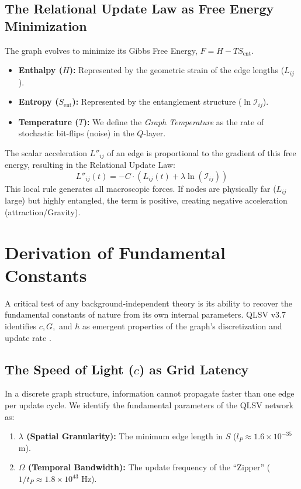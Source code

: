 \documentclass[11pt, a4paper]{article}
\begin{document}
\subsection{The Relational Update Law as Free Energy Minimization}
The graph evolves to minimize its Gibbs Free Energy, $F = H - TS_{\text{ent}}$.
\begin{itemize}
    \item \textbf{Enthalpy ($H$):} Represented by the geometric strain of the edge lengths ($L_{ij}$).
    \item \textbf{Entropy ($S_{\text{ent}}$):} Represented by the entanglement structure ($\ln \mathcal{I}_{ij}$).
    \item \textbf{Temperature ($T$):} We define the \textit{Graph Temperature} as the rate of stochastic bit-flips (noise) in the $Q$-layer.
\end{itemize}
The scalar acceleration $L''_{ij}$ of an edge is proportional to the gradient of this free energy, resulting in the Relational Update Law:
\begin{equation}
    L''_{ij}(t) = -C \cdot \left( L_{ij}(t) + \lambda \ln(\mathcal{I}_{ij}) \right)
\end{equation}
This local rule generates all macroscopic forces. If nodes are physically far ($L_{ij}$ large) but highly entangled, the term is positive, creating negative acceleration (attraction/Gravity).

\section{Derivation of Fundamental Constants}

A critical test of any background-independent theory is its ability to recover the fundamental constants of nature from its own internal parameters. QLSV v3.7 identifies $c, G,$ and $\hbar$ as emergent properties of the graph's discretization and update rate \cite{lloyd2002}.

\subsection{The Speed of Light ($c$) as Grid Latency}
In a discrete graph structure, information cannot propagate faster than one edge per update cycle. We identify the fundamental parameters of the QLSV network as:
\begin{enumerate}
    \item \textbf{$\lambda$ (Spatial Granularity):} The minimum edge length in $S$ ($l_P \approx 1.6 \times 10^{-35}$ m).
    \item \textbf{$\Omega$ (Temporal Bandwidth):} The update frequency of the ``Zipper'' ($1/t_P \approx 1.8 \times 10^{43}$ Hz).
\end{enumerate}
\end{document}
